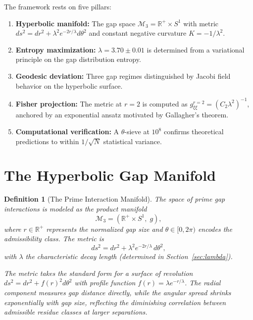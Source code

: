 \documentclass[12pt]{article}
\newtheorem{definition}[theorem]{Definition}
\begin{document}
The framework rests on five pillars:

\begin{enumerate}
  \item \textbf{Hyperbolic manifold:} The gap space $\mathcal{M}_3 = \mathbb{R}^+ \times S^1$
    with metric $ds^2 = dr^2 + \lambda^2 e^{-2r/\lambda} d\theta^2$ and constant
    negative curvature $K = -1/\lambda^2$.
  \item \textbf{Entropy maximization:} $\lambda = 3.70 \pm 0.01$ is determined from a
    variational principle on the gap distribution entropy.
  \item \textbf{Geodesic deviation:} Three gap regimes distinguished by Jacobi
    field behavior on the hyperbolic surface.
  \item \textbf{Fisher projection:} The metric at $r=2$ is computed as
    $g_{\xi\xi}^{r=2} = (C_2 \lambda^2)^{-1}$, anchored by an exponential ansatz
    motivated by Gallagher's theorem.
  \item \textbf{Computational verification:} A $\theta$-sieve at $10^8$ confirms
    theoretical predictions to within $1/\sqrt{N}$ statistical variance.
\end{enumerate}

\section{The Hyperbolic Gap Manifold}

\begin{definition}[The Prime Interaction Manifold]
The space of prime gap interactions is modeled as the product manifold
\[
  \mathcal{M}_3 = \left(\mathbb{R}^+ \times S^1,\; g\right),
\]
where $r \in \mathbb{R}^+$ represents the normalized gap size and
$\theta \in [0, 2\pi)$ encodes the admissibility class. The metric is
\begin{equation}
  ds^2 = dr^2 + \lambda^2 e^{-2r/\lambda}\, d\theta^2,
  \label{eq:metric}
\end{equation}
with $\lambda$ the characteristic decay length (determined in
Section~\ref{sec:lambda}).

The metric takes the standard form for a surface of revolution $ds^2 = dr^2 + f(r)^2 d\theta^2$
with profile function $f(r) = \lambda e^{-r/\lambda}$. The radial component measures
gap distance directly, while the angular spread shrinks exponentially with gap size,
reflecting the diminishing correlation between admissible residue classes at larger
separations.
\end{definition}
\end{document}
